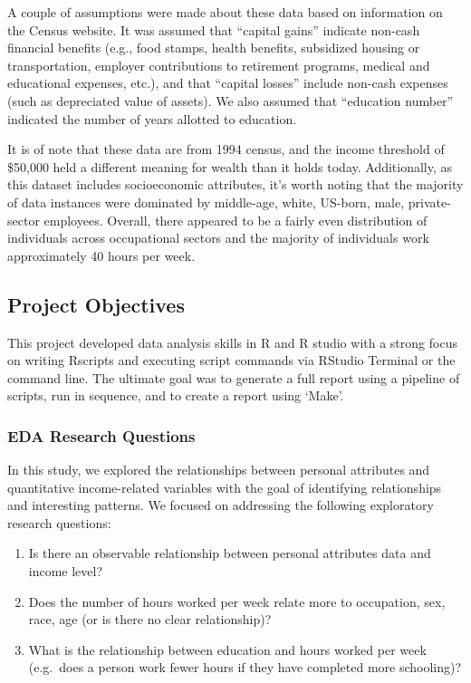 \documentclass[]{article}
\providecommand{\tightlist}{%
  \setlength{\itemsep}{0pt}\setlength{\parskip}{0pt}}
\begin{document}
A couple of assumptions were made about these data based on information
on the Census website. It was assumed that ``capital gains'' indicate
non-cash financial benefits (e.g., food stamps, health benefits,
subsidized housing or transportation, employer contributions to
retirement programs, medical and educational expenses, etc.), and that
``capital losses'' include non-cash expenses (such as depreciated value
of assets). We also assumed that ``education number'' indicated the
number of years allotted to education.

It is of note that these data are from 1994 census, and the income
threshold of \$50,000 held a different meaning for wealth than it holds
today. Additionally, as this dataset includes socioeconomic attributes,
it's worth noting that the majority of data instances were dominated by
middle-age, white, US-born, male, private-sector employees. Overall,
there appeared to be a fairly even distribution of individuals across
occupational sectors and the majority of individuals work approximately
40 hours per week.

\hypertarget{project-objectives}{%
\subsection{Project Objectives}\label{project-objectives}}

This project developed data analysis skills in R and R studio with a
strong focus on writing Rscripts and executing script commands via
RStudio Terminal or the command line. The ultimate goal was to generate
a full report using a pipeline of scripts, run in sequence, and to
create a report using `Make'.

\hypertarget{eda-research-questions}{%
\subsubsection{EDA Research Questions}\label{eda-research-questions}}

In this study, we explored the relationships between personal attributes
and quantitative income-related variables with the goal of identifying
relationships and interesting patterns. We focused on addressing the
following exploratory research questions:

\begin{enumerate}
\def\labelenumi{\arabic{enumi}.}
\tightlist
\item
  Is there an observable relationship between personal attributes data
  and income level?
\item
  Does the number of hours worked per week relate more to occupation,
  sex, race, age (or is there no clear relationship)?
\item
  What is the relationship between education and hours worked per week
  (e.g.~does a person work fewer hours if they have completed more
  schooling)?
\end{enumerate}
\end{document}
